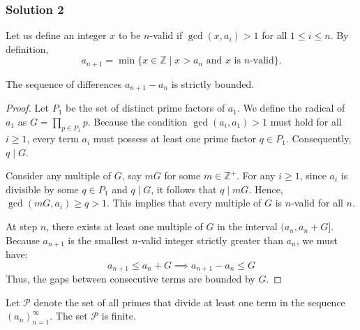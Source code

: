\documentclass[11pt]{article}
\begin{document}
\subsubsection{Solution 2}
Let us define an integer $x$ to be $n$-valid if $\gcd(x, a_i) > 1$ for all $1 \leqslant i \leqslant n$. By definition, $$a_{n+1} = \min \{ x \in \mathbb{Z} \mid x > a_n \text{ and } x \text{ is } n\text{-valid} \}.$$
\begin{claim}
    The sequence of differences $a_{n+1} - a_n$ is strictly bounded.
\end{claim}
\begin{proof}
    Let $P_1$ be the set of distinct prime factors of $a_1$. We define the radical of $a_1$ as $G = \prod_{p \in P_1} p$. Because the condition $\gcd(a_i, a_1) > 1$ must hold for all $i \geqslant 1$, every term $a_i$ must possess at least one prime factor $q \in P_1$. Consequently, $q \mid G$.

\medskip
Consider any multiple of $G$, say $mG$ for some $m \in \mathbb{Z}^+$. For any $i \geqslant 1$, since $a_i$ is divisible by some $q \in P_1$ and $q \mid G$, it follows that $q \mid mG$. Hence, $\gcd(mG, a_i) \geqslant q > 1$. This implies that every multiple of $G$ is $n$-valid for all $n$.

\medskip
At step $n$, there exists at least one multiple of $G$ in the interval $(a_n, a_n + G]$. Because $a_{n+1}$ is the smallest $n$-valid integer strictly greater than $a_n$, we must have:
$$ a_{n+1} \leqslant a_n + G \implies a_{n+1} - a_n \leqslant G $$Thus, the gaps between consecutive terms are bounded by $G$. 
\end{proof}
\begin{claim}
    Let $\mathcal{P}$ denote the set of all primes that divide at least one term in the sequence $(a_n)_{n=1}^\infty$. The set $\mathcal{P}$ is finite.
\end{claim}
\end{document}

